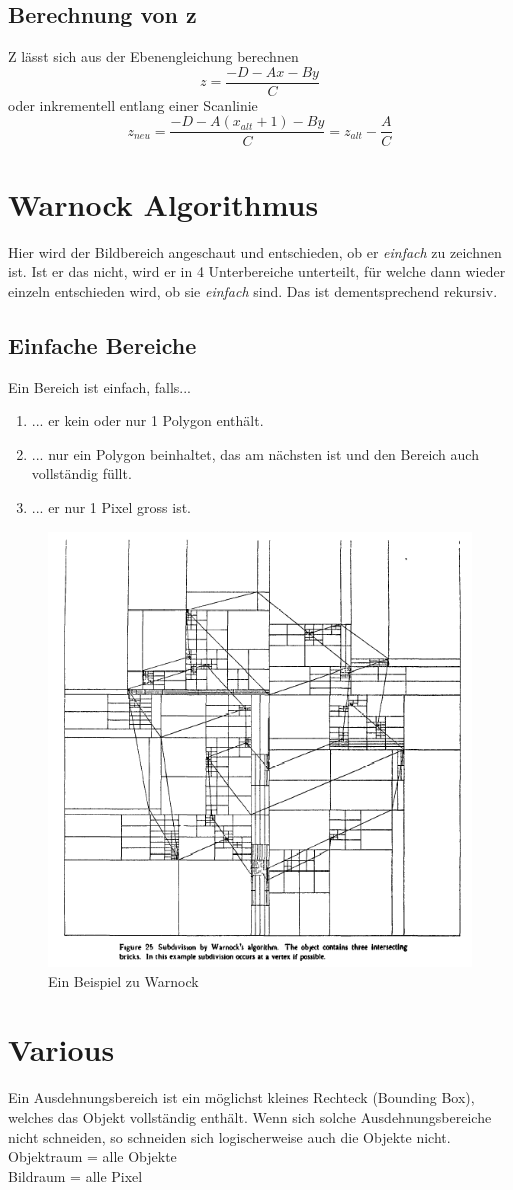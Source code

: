 \subsection{Berechnung von z}
Z lässt sich aus der Ebenengleichung berechnen
\begin{displaymath}
z = \frac{-D-Ax-By}{C}
\end{displaymath}
oder inkrementell entlang einer Scanlinie
\begin{displaymath}
z_{neu} = \frac{-D-A(x_{alt}+1)-By}{C}=z_{alt}-\frac{A}{C}
\end{displaymath}


\section{Warnock Algorithmus}
Hier wird der Bildbereich angeschaut und entschieden, ob er \textit{einfach} zu zeichnen ist. Ist er das nicht, wird er in 4 Unterbereiche unterteilt, für welche dann wieder einzeln entschieden wird, ob sie \textit{einfach} sind. Das ist dementsprechend rekursiv.
\subsection{Einfache Bereiche}
Ein Bereich ist einfach, falls...
\begin{enumerate}
	\item ... er kein oder nur 1 Polygon enthält.
	\item ... nur ein Polygon beinhaltet, das am nächsten ist und den Bereich auch vollständig füllt.
	\item ... er nur 1 Pixel gross ist.
\end{enumerate}
\begin{figure}[!ht]
	\centering
	\includegraphics[width=0.5\linewidth]{fig/warnock}
	\caption{Ein Beispiel zu Warnock}
	\label{fig:warnock}
\end{figure}
\section{Various}
Ein Ausdehnungsbereich ist ein möglichst kleines Rechteck (Bounding Box), welches das Objekt vollständig enthält. Wenn sich solche Ausdehnungsbereiche nicht schneiden, so schneiden sich logischerweise auch die Objekte nicht.\\
Objektraum = alle Objekte\\
Bildraum = alle Pixel